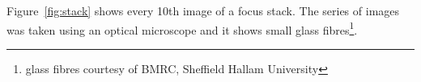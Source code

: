\documentclass[12pt,a4paper,oneside,openright]{book}
\newcommand{\fig}[1]{Figure~\ref{fig:#1}}
\begin{document}
\begin{CJK}{UTF8}{}
\fig{stack} shows every 10th image of a focus stack. The series of images was taken using an optical microscope and it shows small glass fibres\footnote{glass fibres courtesy of BMRC, Sheffield Hallam University}.
\begin{figure}[htbp]
  \begin{center}

\end{center}
\end{figure}
\end{CJK}
\end{document}
